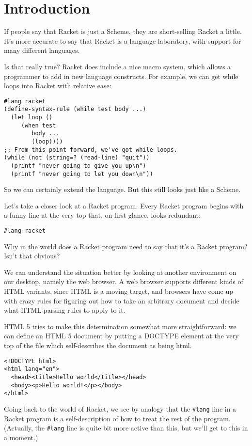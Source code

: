 \documentclass{article}
\begin{document}
\section{Introduction}

If people say that Racket is just a Scheme, they are short-selling Racket a little. It's more accurate to say that Racket is a language laboratory, with support for many different languages.

Is that really true? Racket does include a nice macro system, which allows a programmer to add in new language constructs. For example, we can get while loops into Racket with relative ease:
\begin{verbatim}
#lang racket
(define-syntax-rule (while test body ...)
  (let loop ()
     (when test
        body ...
        (loop))))
;; From this point forward, we've got while loops.
(while (not (string=? (read-line) "quit"))
  (printf "never going to give you up\n")
  (printf "never going to let you down\n"))
\end{verbatim}
So we can certainly extend the language. But this still looks just like a Scheme.

Let's take a closer look at a Racket program. Every Racket program begins with a funny line at the very top that, on first glance, looks redundant:
\begin{verbatim}
#lang racket
\end{verbatim}
Why in the world does a Racket program need to say that it's a Racket program? Isn't that obvious?


We can understand the situation better by looking at another environment on our desktop, namely the web browser. A web browser supports different kinds of HTML variants, since HTML is a moving target, and browsers have come up with crazy rules for figuring out how to take an arbitrary document and decide what HTML parsing rules to apply to it.

HTML 5 tries to make this determination somewhat more straightforward: we can define an HTML 5 document by putting a DOCTYPE element at the very top of the file which self-describes the document as being html.
\begin{verbatim}
<!DOCTYPE html>
<html lang="en">
  <head><title>Hello world</title></head>
  <body><p>Hello world!</p></body>
</html>
\end{verbatim}

Going back to the world of Racket, we see by analogy that the \verb+#lang+ line in a Racket program is a self-description of how to treat the rest of the program. (Actually, the \verb+#lang+ line is quite bit more active than this, but we'll get to this in a moment.)
\end{document}
